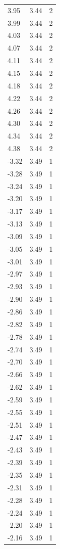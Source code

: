 \begin{longtable}{lrr}
  3.95 & 3.44 & 2 \\
  3.99 & 3.44 & 2 \\
  4.03 & 3.44 & 2 \\
  4.07 & 3.44 & 2 \\
  4.11 & 3.44 & 2 \\
  4.15 & 3.44 & 2 \\
  4.18 & 3.44 & 2 \\
  4.22 & 3.44 & 2 \\
  4.26 & 3.44 & 2 \\
  4.30 & 3.44 & 2 \\
  4.34 & 3.44 & 2 \\
  4.38 & 3.44 & 2 \\
  -3.32 & 3.49 & 1 \\
  -3.28 & 3.49 & 1 \\
  -3.24 & 3.49 & 1 \\
  -3.20 & 3.49 & 1 \\
  -3.17 & 3.49 & 1 \\
  -3.13 & 3.49 & 1 \\
  -3.09 & 3.49 & 1 \\
  -3.05 & 3.49 & 1 \\
  -3.01 & 3.49 & 1 \\
  -2.97 & 3.49 & 1 \\
  -2.93 & 3.49 & 1 \\
  -2.90 & 3.49 & 1 \\
  -2.86 & 3.49 & 1 \\
  -2.82 & 3.49 & 1 \\
  -2.78 & 3.49 & 1 \\
  -2.74 & 3.49 & 1 \\
  -2.70 & 3.49 & 1 \\
  -2.66 & 3.49 & 1 \\
  -2.62 & 3.49 & 1 \\
  -2.59 & 3.49 & 1 \\
  -2.55 & 3.49 & 1 \\
  -2.51 & 3.49 & 1 \\
  -2.47 & 3.49 & 1 \\
  -2.43 & 3.49 & 1 \\
  -2.39 & 3.49 & 1 \\
  -2.35 & 3.49 & 1 \\
  -2.31 & 3.49 & 1 \\
  -2.28 & 3.49 & 1 \\
  -2.24 & 3.49 & 1 \\
  -2.20 & 3.49 & 1 \\
  -2.16 & 3.49 & 1 \\

\end{longtable}
